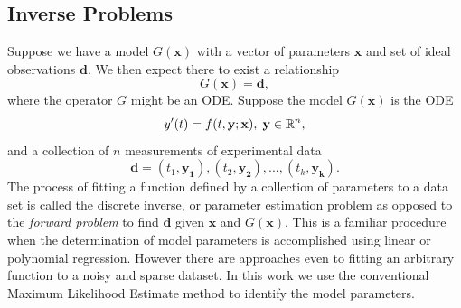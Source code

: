 \documentclass[12pt,a4paper,oneside]{book}
\begin{document}
\subsection{Inverse Problems}
Suppose we have a model $G(\mathbf{x})$ with a vector of parameters $\mathbf{x}$ and set of ideal observations $\mathbf{d}$. We then expect there to exist a relationship 
\[G(\mathbf{x}) = \mathbf{d} ,\]
where the operator $G$ might be an ODE. Suppose the model $G(\mathbf{x})$ is the ODE
\[ y'(t) = f(t, \mathbf{y}; \mathbf{x}), \hspace{1 mm}  \mathbf{y} \in \mathbb{R}^n, \]
and a collection of $n$ measurements of experimental data
\[ \mathbf{d} = \left( t_1, \mathbf{y_1} \right), 
\left( t_2, \mathbf{y_2} \right), ... ,
\left( t_k, \mathbf{y_k} \right).\]
The process of fitting a function defined by a collection of parameters to a data set is called the discrete inverse, or parameter estimation problem as opposed to the \emph{forward problem} to find $\mathbf{d}$ given $\mathbf{x}$ and $G(\mathbf{x})$. This is a familiar procedure when the determination of model parameters is accomplished using linear or polynomial regression. However there are approaches even to fitting an arbitrary function to a noisy and sparse dataset. In this work we use the conventional Maximum Likelihood Estimate method to identify the model parameters.
\end{document}
